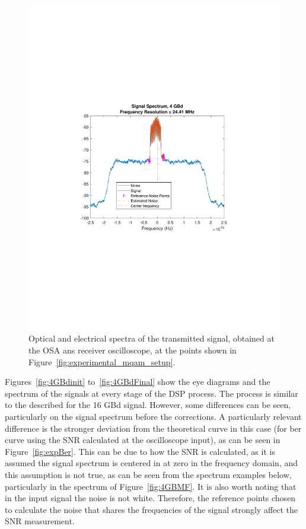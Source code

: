\begin{refsection}
\begin{figure}[H]
\begin{minipage}{0.43\textwidth}
		\includegraphics[clip, trim=4cm 8cm 4cm 8cm, width=1\textwidth]{./sdf/m_qam_system/figures/expResults/4GBdSpectrum.pdf}
		\caption{}
		\label{fig:4GBdSpect}
	\end{minipage}
	\caption{Optical and electrical spectra of the transmitted signal, obtained at the OSA ans receiver oscilloscope, at the points shown in Figure~\ref{fig:experimental_mqam_setup}.}
\end{figure}



Figures~\ref{fig:4GBdinit} to~\ref{fig:4GBdFinal} show the eye diagrams and the spectrum of the signals at every stage of the DSP process. The process is similar to the described for the 16 GBd signal. However, some differences can be seen, particularly on the signal spectrum before the corrections. A particularly relevant difference is the stronger deviation from the theoretical curve in this case (for ber curve using the SNR calculated at the oscilloscope input), as can be seen in Figure~\ref{fig:expBer}. This can be due to how the SNR is calculated, as it is assumed the signal spectrum is centered in at zero in the frequency domain, and this assumption is not true, as can be seen from the spectrum examples below, particularly in the spectrum of Figure~\ref{fig:4GBMF}.
It is also worth noting that in the input signal the noise is not white. Therefore, the reference points chosen to calculate the noise that shares the frequencies of the signal strongly affect the SNR measurement.


\end{refsection}
